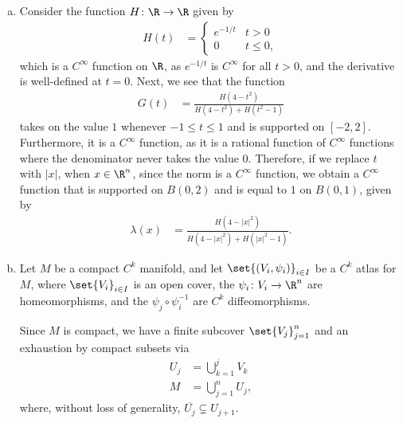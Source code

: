 \documentclass[10pt]{mypackage}
\begin{document}
\begin{solution}
  \begin{enumerate}[(a)]
    \item Consider the function $H\colon \R\rightarrow \R$ given by
      \begin{align*}
        H(t) &= \begin{cases}
          e^{-1/t} & t > 0\\
          0 & t\leq 0,
        \end{cases}
      \end{align*}
      which is a $C^{\infty}$ function on $\R$, as $e^{-1/t}$ is $C^{\infty}$ for all $t > 0$, and the derivative is well-defined at $t = 0$. Next, we see that the function
      \begin{align*}
        G(t) &= \frac{H\left( 4-t^2 \right)}{H\left( 4-t^2 \right) + H\left( t^2 - 1 \right)}
      \end{align*}
      takes on the value $1$ whenever $-1\leq t \leq 1$ and is supported on $[-2,2]$. Furthermore, it is a $C^{\infty}$ function, as it is a rational function of $C^{\infty}$ functions where the denominator never takes the value $0$. Therefore, if we replace $t$ with $\left\vert x \right\vert$, when $x \in \R^{n}$, since the norm is a $C^{\infty}$ function, we obtain a $C^{\infty}$ function that is supported on $B\left( 0,2 \right)$ and is equal to $1$ on $B\left( 0,1 \right)$, given by
      \begin{align*}
        \lambda\left( x \right) &= \frac{H\left( 4-\left\vert x \right\vert^2 \right)}{H\left( 4-\left\vert x \right\vert^2 \right) + H\left( \left\vert x \right\vert^2 - 1 \right)}.
      \end{align*}
    \item Let $M$ be a compact $C^{k}$ manifold, and let $\set{\left( V_i,\psi_i \right)}_{i\in I}$ be a $C^{k}$ atlas for $M$, where  $\set{V_i}_{i\in I}$ is an open cover, the $\psi_i\colon V_i\rightarrow \R^{n}$ are homeomorphisms, and the $\psi_{j}\circ \psi_{i}^{-1}$ are $C^{k}$ diffeomorphisms.\newline

      Since $M$ is compact, we have a finite subcover $\set{V_j}_{j=1}^{n}$ and an exhaustion by compact subsets via
      \begin{align*}
        U_{j} &= \bigcup_{k=1}^{j} V_k\\
        M &= \bigcup_{j=1}^{n}U_j,
      \end{align*}
      where, without loss of generality, $ \overline{U_{j}} \subsetneq U_{j+1}$.\newline


\end{enumerate}
\end{solution}
\end{document}
